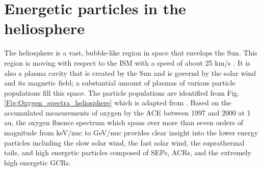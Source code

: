 \section{Energetic particles in the heliosphere}
\label{sec:particles_heliosphere}


The heliosphere is a vast, bubble-like region in space that envelops the Sun. This region is moving with respect to the \ac{ISM} with a speed of about 25 km/s \citep{McComas2015ApJS}. It is also a plasma cavity that is created by the Sun and is governd by the solar wind and its magnetic field; a substantial amount of plasmas of various particle populations fill this space. The particle populations are identified from Fig.\ref{Fig:Oxygen_spectra_heliosphere} which is adapted from \citet{Mewaldt-2001}. Based on the accumulated measurements of oxygen by the \ac{ACE} between 1997 and 2000 at 1 au, the oxygen fluence spectrum which spans over more than seven orders of magnitude from keV/nuc to GeV/nuc provides clear insight into the lower energy particles including the slow solar wind, the fast solar wind, the suprathermal tails, and high energetic particles composed of \acp{SEP}, \acp{ACR}, and the extremely high energetic \acp{GCR}. 


